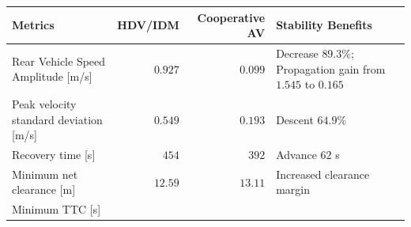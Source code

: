 \documentclass[11pt,a4paper,openany]{book}
\numberwithin{equation}{chapter}
\numberwithin{figure}{chapter}
\numberwithin{table}{chapter}
\begin{document}
\begin{center}
\small
{}
\label{tab:application-av-benefits}
\begin{tabular}{p{4.2cm}rrp{4.4cm}}
\toprule
\textbf{Metrics} & \textbf{HDV/IDM} & \textbf{Cooperative AV} & \textbf{Stability Benefits} \\
\midrule







Rear Vehicle Speed Amplitude [m/s]& $0.927$ & $0.099$ & Decrease $89.3\%$; Propagation gain from $1.545$ to $0.165$



\\







Peak velocity standard deviation [m/s]




& $0.549$ & $0.193$ &




 Descent $64.9\%$



\\







 Recovery time [s]




& $454$ & $392$ &




 Advance $62$ s



\\







Minimum net clearance [m]




& $12.59$ & $13.11$ &




 Increased clearance margin



\\







Minimum TTC [s]





\end{tabular}
\end{center}
\end{document}
